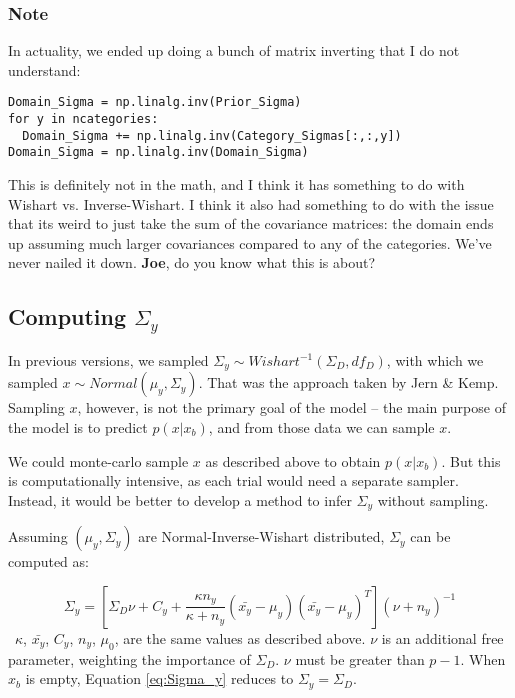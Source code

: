 \documentclass[12pt]{article}
\begin{document}
\subsubsection*{Note}
In actuality, we ended up doing a bunch of matrix inverting that I do not understand:
\begin{verbatim}
Domain_Sigma = np.linalg.inv(Prior_Sigma)
for y in ncategories:
  Domain_Sigma += np.linalg.inv(Category_Sigmas[:,:,y])
Domain_Sigma = np.linalg.inv(Domain_Sigma)
\end{verbatim}
This is definitely not in the math, and I think it has something to do with Wishart vs. Inverse-Wishart. I think it also had something to do with the issue that its weird to just take the sum of the covariance matrices: the domain ends up assuming much larger covariances compared to any of the categories. We've never nailed it down. \textbf{Joe}, do you know what this is about?


\subsection*{Computing $\Sigma_y$}

In previous versions, we sampled $\Sigma_y \sim Wishart^{-1}(\Sigma_D, df_D)$, with which we sampled $x \sim Normal(\mu_y, \Sigma_y)$. That was the approach taken by Jern \& Kemp. Sampling $x$, however, is not the primary goal of the model -- the main purpose of the model is to predict $p(x | x_b)$, and from those data we can sample $x$.

We could monte-carlo sample $x$ as described above to obtain $p(x | x_b)$. But this is computationally intensive, as each trial would need a separate sampler. Instead, it would be better to develop a method to infer $\Sigma_y$ without sampling.

Assuming $(\mu_y, \Sigma_y)$ are Normal-Inverse-Wishart distributed, $\Sigma_y$ can be computed as:

\begin{equation}
  \Sigma_y = [\Sigma_D\nu + C_y +
    \dfrac
    {\kappa n_y}
    {\kappa + n_y}
    (\bar{x_y}-\mu_y)(\bar{x_y}-\mu_y)^T
  ] (\nu + n_y)^{-1}
  \label{eq:Sigma_y}
\end{equation}
\
$\kappa$, $\bar{x_y}$, $C_y$, $n_y$, $\mu_0$,  are the same values as described above. $\nu$ is an additional free parameter, weighting the importance of $\Sigma_{D}$. $\nu$ must be greater than $p-1$. When $x_b$ is empty, Equation \ref{eq:Sigma_y} reduces to $\Sigma_y = \Sigma_D$. 
\end{document}
